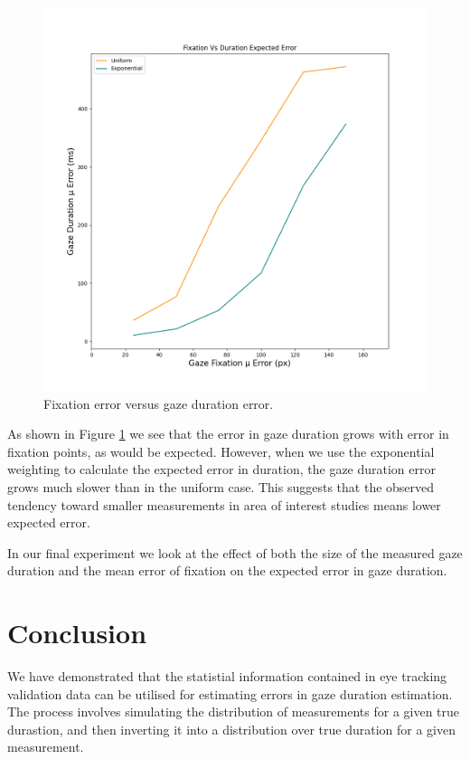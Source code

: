 \documentclass[12pt,a4paper]{article}
\numberwithin{equation}{section}
\begin{document}
\begin{figure}[h!]
\includegraphics[scale=0.5]{../results/Fixation_vs_duration_error.png}
\caption{Fixation error versus gaze duration error.}
\label{fig:fixation_vs_duration}
\end{figure}

As shown in Figure \ref{fig:fixation_vs_duration} we see that the error in gaze duration
grows with error in fixation points, as would be expected. However, when we use the exponential
weighting to calculate the expected error in duration, the gaze duration error grows much slower
than in the uniform case. This suggests that the observed tendency toward smaller measurements
in area of interest studies means lower expected error.

In our final experiment we look at the effect of both the size of the measured 
gaze duration and the mean error of fixation on the expected error in gaze duration.


\section{Conclusion}

We have demonstrated that the statistial information contained in eye tracking validation
data can be utilised for estimating errors in gaze duration estimation. The process involves
simulating the distribution of measurements for a given true durastion, and then inverting
it into a distribution over true duration for a given measurement.
\end{document}
